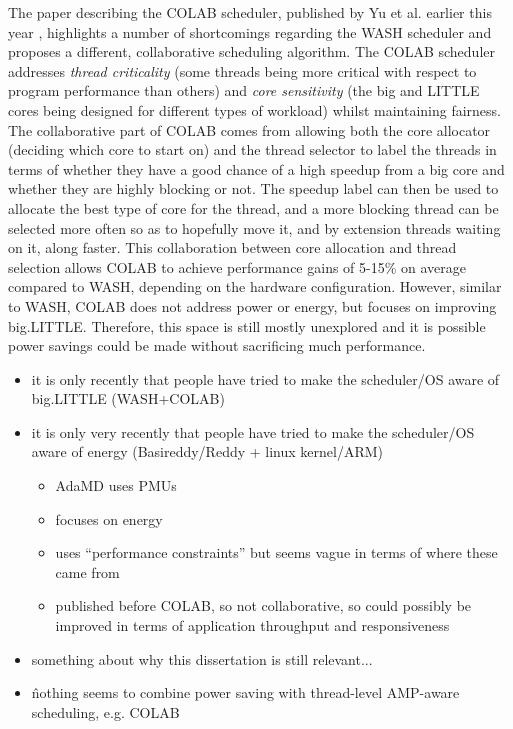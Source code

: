 The paper describing the COLAB scheduler, published by Yu et al. earlier this
year \cite{yu_colab_2020}, highlights a number of shortcomings regarding the
WASH scheduler and proposes a different, collaborative scheduling algorithm. The
COLAB scheduler addresses \textit{thread criticality} (some threads being more
critical with respect to program performance than others) and
\textit{core sensitivity} (the big and LITTLE cores being designed for different
types of workload) whilst maintaining fairness. The collaborative part of COLAB
comes from allowing both the core allocator (deciding which core to start on)
and the thread selector to label the threads in terms of whether they have a
good chance of a high speedup from a big core and whether they are highly
blocking or not. The speedup label can then be used to allocate the best type of
core for the thread, and a more blocking thread can be selected more often so as
to hopefully move it, and by extension threads waiting on it, along faster. This
collaboration between core allocation and thread selection allows COLAB to
achieve performance gains of 5-15\% on average compared to WASH, depending on
the hardware configuration. However, similar to WASH, COLAB does not address
power or energy, but focuses on improving big.LITTLE. Therefore, this space is
still mostly unexplored and it is possible power savings could be made without
sacrificing much performance.

\begin{itemize}
    \item it is only recently that people have tried to make the scheduler/OS
          aware of big.LITTLE (WASH+COLAB)
    \item it is only very recently that people have tried to make the
          scheduler/OS aware of energy (Basireddy/Reddy + linux kernel/ARM)
    \begin{itemize}
        \item AdaMD uses PMUs
        \item focuses on energy
        \item uses ``performance constraints'' but seems vague in terms of where
              these came from
        \item published before COLAB, so not collaborative, so could possibly be
              improved in terms of application throughput and responsiveness
    \end{itemize}
    \item something about why this dissertation is still relevant...
    \item \^ nothing seems to combine power saving with thread-level AMP-aware
          scheduling, e.g. COLAB
\end{itemize}
